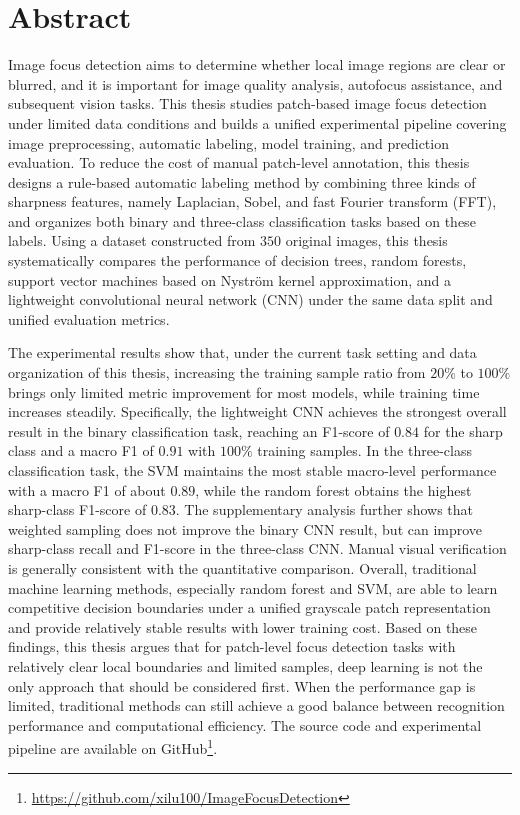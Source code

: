 \clearpage
\section*{Abstract}

\par Image focus detection aims to determine whether local image regions are
clear or blurred, and it is important for image quality analysis, autofocus
assistance, and subsequent vision tasks. This thesis studies patch-based image
focus detection under limited data conditions and builds a unified experimental
pipeline covering image preprocessing, automatic labeling, model training, and
prediction evaluation. To reduce the cost of manual patch-level annotation,
this thesis designs a rule-based automatic labeling method by combining three
kinds of sharpness features, namely Laplacian, Sobel, and fast Fourier
transform (FFT), and organizes both binary and three-class classification tasks
based on these labels. Using a dataset constructed from $350$ original images,
this thesis
systematically compares the performance of decision trees, random forests,
support vector machines based on Nystr\"{o}m kernel approximation, and a
lightweight convolutional neural network (CNN) under the same data split and
unified evaluation metrics.

\par The experimental results show that, under the current task setting and data
organization of this thesis, increasing the training sample ratio from $20\%$ to
$100\%$ brings only limited metric improvement for most models, while training
time increases steadily. Specifically, the lightweight CNN achieves the
strongest overall result in the binary classification task, reaching an
F1-score of $0.84$ for the sharp class and a macro F1 of $0.91$ with $100\%$
training samples. In the three-class classification task, the SVM maintains the
most stable macro-level performance with a macro F1 of about $0.89$, while the
random forest obtains the highest sharp-class F1-score of $0.83$. The
supplementary analysis further shows that weighted sampling does not improve
the binary CNN result, but can improve sharp-class recall and F1-score in the
three-class CNN. Manual visual verification is generally consistent with the
quantitative comparison. Overall, traditional machine learning methods,
especially random forest and SVM, are able to learn competitive decision
boundaries under a unified grayscale patch representation and provide
relatively stable results with lower training cost. Based on these findings,
this thesis argues that for patch-level focus detection tasks with relatively
clear local boundaries and limited samples, deep learning is not the only
approach that should be considered first. When the performance gap is limited,
traditional methods can still achieve a good balance between recognition
performance and computational efficiency. The source code and experimental
pipeline are available on
GitHub\footnote{\url{https://github.com/xilu100/ImageFocusDetection}}.
